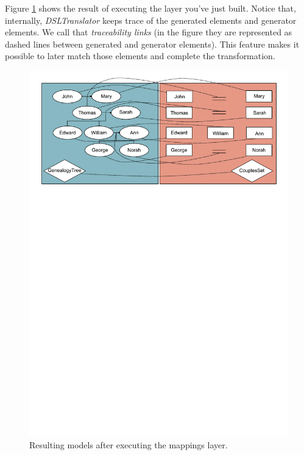 Figure \ref{fig:first_layer_result} shows the result of executing the layer
you've just built. Notice that, internally, \emph{DSLTranslator} keeps trace of
the generated elements and generator elements. We call that \emph{traceability
links} (in the figure they are represented as dashed lines between generated
and generator elements). This feature makes it possible to later match those
elements and complete the transformation.

\begin{figure}[h]
\begin{center}
  \includegraphics[scale=0.6, trim=0.8cm 20.3cm 0.7cm 0.3cm,
  clip]{imgs/first_layer_result.pdf}
  \caption{Resulting models after executing the mappings layer.}
  \label{fig:first_layer_result}
\end{center}
\end{figure}

